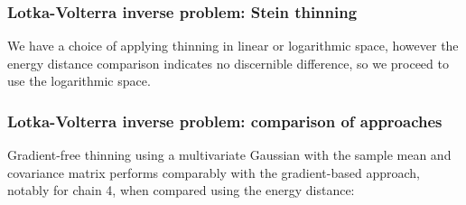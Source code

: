 \documentclass{beamer}
\begin{document}
\begin{frame}
\frametitle{Lotka-Volterra inverse problem: Stein thinning}

We have a choice of applying thinning in linear or logarithmic space, however the energy distance comparison indicates no discernible difference, so we proceed to use the logarithmic space.

\begin{figure}[h]
\centering
{}
\end{figure}

\end{frame}

\begin{frame}
\frametitle{Lotka-Volterra inverse problem: comparison of approaches}

Gradient-free thinning using a multivariate Gaussian with the sample mean and covariance matrix performs comparably with the gradient-based approach, notably for chain 4, when compared using the energy distance:

\begin{figure}[h]
\centering
{}
\end{figure}

\end{frame}
\end{document}
